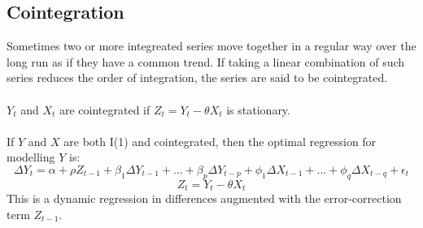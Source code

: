 \documentclass{article}
\begin{document}
\subsection{Cointegration}
Sometimes two or more integreated series move together in a regular way over the long run as if they have a common trend. If taking a linear combination of such series reduces the order of integration, the series are said to be cointegrated. \\
\\
$Y_t$ and $X_t$ are cointegrated if $Z_t = Y_t - \theta X_t$ is stationary.\\
\\
If $Y$ and $X$ are both I(1) and cointegrated, then the optimal regression for modelling $Y$ is:
$$\Delta Y_t = \alpha + \rho Z_{t-1} + \beta_1 \Delta Y_{t-1} + ... + \beta_p \Delta Y_{t-p} + \phi_1 \Delta X_{t-1} + ... + \phi_q \Delta X_{t-q} + \epsilon_t$$
$$Z_t = Y_t - \theta X_t$$
This is a dynamic regression in differences augmented with the error-correction term $Z_{t-1}$.
\end{document}
